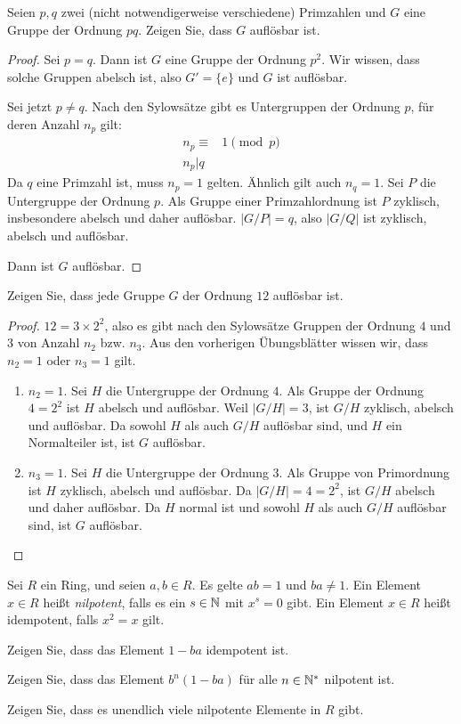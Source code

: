 \begin{Problem}
	Seien $p,q$ zwei (nicht notwendigerweise verschiedene) Primzahlen und $G$ eine Gruppe der Ordnung $pq$. Zeigen Sie, dass $G$ auflösbar ist.  
\end{Problem}
\begin{proof}
	Sei $p=q$. Dann ist $G$ eine Gruppe der Ordnung $p^2$. Wir wissen, dass solche Gruppen abelsch ist, also $G'=\{e\} $ und $G$ ist auflösbar.

	Sei jetzt $p\neq q$. Nach den Sylowsätze gibt es Untergruppen der Ordnung $p$, f\"{u}r deren Anzahl $n_p$ gilt:
	\begin{align*}
		n_p\equiv& 1\pmod{p}\\
		n_p|q
	\end{align*}
	Da $q$ eine Primzahl ist, muss $n_p=1$ gelten. Ähnlich gilt auch $n_q=1$. Sei $P$ die Untergruppe der Ordnung $p$. Als Gruppe einer Primzahlordnung ist $P$ zyklisch, insbesondere abelsch und daher auflösbar. $|G / P|=q$, also $|G / Q|$ ist zyklisch, abelsch und auflösbar. 

	Dann ist $G$ auflösbar.
\end{proof}
\begin{Problem}
	Zeigen Sie, dass jede Gruppe $G$ der Ordnung $12$ auflösbar ist.
\end{Problem}
\begin{proof}
	$12=3\times 2^2$, also es gibt nach den Sylowsätze Gruppen der Ordnung $4$ und $3$ von Anzahl $n_2$ bzw. $n_3$. Aus den vorherigen Übungsblätter wissen wir, dass $n_2= 1$ oder $n_3=1$ gilt. 
	\begin{enumerate}
		\item $n_2=1$. Sei $H$ die Untergruppe der Ordnung $4$. Als Gruppe der Ordnung $4=2^2$ ist $H$ abelsch und auflösbar. Weil $|G / H|=3$, ist $G / H$ zyklisch, abelsch und auflösbar. Da sowohl $H$ als auch $G / H$ auflösbar sind, und $H$ ein Normalteiler ist, ist $G$ auflösbar.
		\item $n_3=1$. Sei $H$ die Untergruppe der Ordnung $3$. Als Gruppe von Primordnung ist $H$ zyklisch, abelsch und auflösbar. Da $|G / H|=4=2^2$, ist $G / H$ abelsch und daher auflösbar. Da $H$ normal ist und sowohl $H$ als auch $G / H$ auflösbar sind, ist $G$ auflösbar.\qedhere 
	\end{enumerate}
\end{proof}
\begin{Problem}
	Sei $R$ ein Ring, und seien $a,b\in R$. Es gelte $ab=1$ und $ba\neq 1$. Ein Element $x\in R$ heißt \emph{nilpotent}, falls es ein $s\in \mathbb{N}$ mit $x^s=0$ gibt. Ein Element $x\in R$ heißt idempotent, falls $x^2=x$ gilt.
	\begin{parts}
		\item Zeigen Sie, dass das Element $1-ba$ idempotent ist.
		\item Zeigen Sie, dass das Element $b^n(1-ba)$ f\"{u}r alle $n\in \mathbb{N}^*$ nilpotent ist.
		\item Zeigen Sie, dass es unendlich viele nilpotente Elemente in $R$ gibt.
	\end{parts}
\end{Problem}
